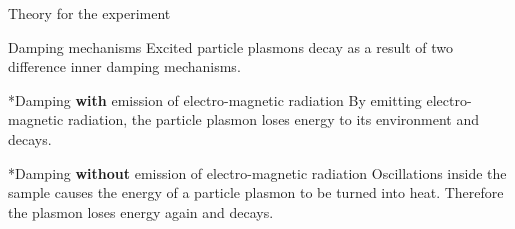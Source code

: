 \documentclass[pdftex, a4paper,11pt, twoside, UKenglish]{report}
\begin{document}
  \begin{chapter}{Theory for the experiment}
    \label{chp:Theory}
    
    
    
    \begin{section}{Damping mechanisms}
      \label{chp:TheoryDamping}
      Excited particle plasmons decay as a result of two difference inner
      damping mechanisms. 
      
      \begin{subsection}*{Damping \textbf{with} emission of electro-magnetic
        radiation}
        By emitting electro-magnetic radiation, the particle plasmon loses
        energy to its environment and decays.
      \end{subsection}
      
      \begin{subsection}*{Damping \textbf{without} emission of electro-magnetic
        radiation}
        Oscillations inside the sample causes the energy of a particle plasmon
        to be turned into heat. Therefore the plasmon loses energy again and
        decays.
      \end{subsection}
      
    \end{section}
    
    
    

\end{chapter}
\end{document}
